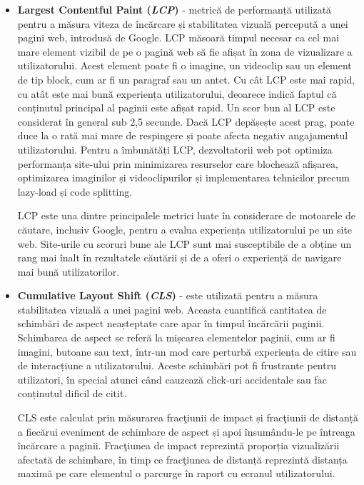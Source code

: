 \documentclass[12pt, a4paper]{report}
\begin{document}
\begin{itemize}
	\item \textbf{Largest Contentful Paint (\emph{LCP})} - metrică de performanță utilizată pentru a măsura viteza de încărcare și stabilitatea vizuală percepută a unei pagini web, introdusă de Google. LCP măsoară timpul necesar ca cel mai mare element vizibil de pe o pagină web să fie afișat în zona de vizualizare a utilizatorului. Acest element poate fi o imagine, un videoclip sau un element de tip block, cum ar fi un paragraf sau un antet. Cu cât LCP este mai rapid, cu atât este mai bună experiența utilizatorului, deoarece indică faptul că conținutul principal al paginii este afișat rapid. Un scor bun al LCP este considerat în general sub 2,5 secunde. Dacă LCP depășește acest prag, poate duce la o rată mai mare de respingere și poate afecta negativ angajamentul utilizatorului. Pentru a îmbunătăți LCP, dezvoltatorii web pot optimiza performanța site-ului prin minimizarea resurselor care blochează afișarea, optimizarea imaginilor și videoclipurilor și implementarea tehnicilor precum lazy-load și code splitting.

	      LCP este una dintre principalele metrici luate în considerare de motoarele de căutare, inclusiv Google, pentru a evalua experiența utilizatorului pe un site web. Site-urile cu scoruri bune ale LCP sunt mai susceptibile de a obține un rang mai înalt în rezultatele căutării și de a oferi o experiență de navigare mai bună utilizatorilor. \cite{lcp}
	\item \textbf{Cumulative Layout Shift (\emph{CLS})} - este utilizată pentru a măsura stabilitatea vizuală a unei pagini web. Aceasta cuantifică cantitatea de schimbări de aspect neașteptate care apar în timpul încărcării paginii. Schimbarea de aspect se referă la mișcarea elementelor paginii, cum ar fi imagini, butoane sau text, într-un mod care perturbă experiența de citire sau de interacțiune a utilizatorului. Aceste schimbări pot fi frustrante pentru utilizatori, în special atunci când cauzează click-uri accidentale sau fac conținutul dificil de citit.

	      CLS este calculat prin măsurarea frac\c tiunii de impact și frac\c tiunii de distanță a fiecărui eveniment de schimbare de aspect și apoi însumându-le pe întreaga încărcare a paginii. Frac\c tiunea de impact reprezintă proporția vizualizării afectată de schimbare, în timp ce frac\c tiunea de distanță reprezintă distanța maximă pe care elementul o parcurge în raport cu ecranul utilizatorului. \cite{cls}


\end{itemize}
\end{document}
